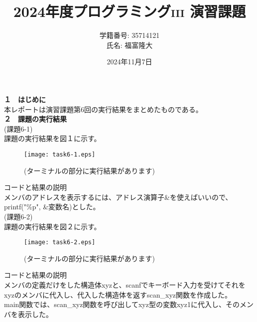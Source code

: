 \documentclass[a4j]{jsarticle}
\title{2024年度プログラミング\textsc{iii} 演習課題}
\author{学籍番号: 35714121 \\ 氏名: 福富隆大}
\date{2024年11月7日}
\begin{document}
\maketitle

\textbf{１　はじめに} \\

本レポートは演習課題第6回の実行結果をまとめたものである。\\

\textbf{２　課題の実行結果} \\

\textmd{(課題6-1)} \\

課題の実行結果を図１に示す。 \\

\begin{figure}[htbp]
  \centering 
  \texttt{[image: task6-1.eps]}
  \caption{(ターミナルの部分に実行結果があります)}
  \label{fig:sample1} %
\end{figure}

\textmd{コードと結果の説明} \\
メンバのアドレスを表示するには、アドレス演算子\&を使えばいいので、printf("\%p", \&変数名)とした。\\

\textmd{(課題6-2)} \\

課題の実行結果を図２に示す。\\

\begin{figure}[htbp]
  \centering
  \texttt{[image: task6-2.eps]}
  \caption{(ターミナルの部分に実行結果があります)}
  \label{fig:sample2} %
\end{figure}

\textmd{コードと結果の説明} \\
メンバの定義だけをした構造体xyzと、scanfでキーボード入力を受けてそれをxyzのメンバに代入し、代入した構造体を返すscan\_xyz関数を作成した。\\
main関数では、scan\_xyz関数を呼び出してxyz型の変数xyz1に代入し、そのメンバを表示した。\\
\end{document}
